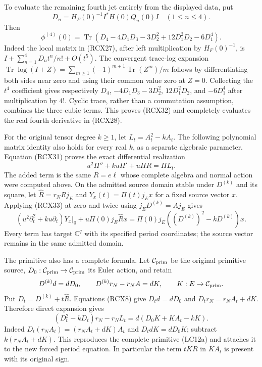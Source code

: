 \documentclass{article}
\begin{document}
To evaluate the remaining fourth jet entirely from the displayed
data, put
\[
 D_n=H_F(0)^{-1}I^*H(0)Q_n(0)I\quad(1\le n\le4).
\]
Then
\[
 \phi^{(4)}(0)=
 \operatorname{Tr}\!\left(
 D_4-4D_1D_3-3D_2^2+12D_1^2D_2-6D_1^4\right).
 \tag{RCX32}
\]
Indeed the local matrix in (RCX27), after left multiplication by
\(H_F(0)^{-1}\), is
\(I+\sum_{n=1}^4D_nt^n/n!+O(t^5)\).
The convergent trace-log expansion
\(\operatorname{Tr}\log(I+Z)
=\sum_{m\ge1}(-1)^{m+1}\operatorname{Tr}(Z^m)/m\)
follows by differentiating both sides near zero and using their
common value zero at \(Z=0\).
Collecting the \(t^4\) coefficient gives respectively
\(D_4\), \(-4D_1D_3-3D_2^2\),
\(12D_1^2D_2\), and \(-6D_1^4\) after multiplication by \(4!\).
Cyclic trace, rather than a commutation assumption, combines the
three cubic terms. This proves (RCX32) and completely evaluates
the real fourth derivative in (RCX28).

For the original tensor degree \(k\ge1\), let \(L_t=A_t^2-kA_t\).
The following polynomial matrix identity also holds for every real
\(k\), as a separate algebraic parameter.
Equation (RCX31) proves the exact differential realization
\[
 \boxed{u^2\Pi''+ku\Pi'+u\Pi R=\Pi L_t.}
 \tag{RCX33}
\]
The added term is the same \(R=e\ell\) whose complete algebra
and normal action were computed above. On the admitted source
domain stable under \(D^{(k)}\) and its square, let
\(\widehat R=r_NRj_E\) and \(Y_x(t)=\Pi(t)j_Ex\) for a fixed
source vector \(x\). Applying (RCX33) at zero and twice using
\(j_ED^{(k)}=Aj_E\) gives
\[
 (u^2\partial_t^2+ku\partial_t)Y_x|_0
       +u\Pi(0)j_E\widehat R x
 =\Pi(0)j_E((D^{(k)})^2-kD^{(k)})x .
 \tag{RCX34}
\]
Every term has target \(\mathbb C^q\) with its specified period
coordinates; the source vector remains in the same admitted domain.

The primitive also has a complete formula. Let
\(\mathcal C_{\rm prim}\) be the original primitive source,
\(D_0:\mathcal C_{\rm prim}\to\mathcal C_{\rm prim}\) its Euler
action, and retain
\[
 D^{(k)}d=dD_0,\qquad
 D^{(k)}r_N-r_NA=dK,\qquad K:E\to\mathcal C_{\rm prim}.
\]
Put \(D_t=D^{(k)}+t\widehat R\). Equations (RCX8) give
\(D_td=dD_0\) and \(D_tr_N=r_NA_t+dK\).
Therefore direct expansion gives
\[
 \boxed{(D_t^2-kD_t)r_N-r_NL_t
       =d(D_0K+KA_t-kK).}
 \tag{RCX35}
\]
Indeed \(D_t(r_NA_t)=(r_NA_t+dK)A_t\) and
\(D_tdK=dD_0K\); subtract \(k(r_NA_t+dK)\).
This reproduces the complete primitive (LC12a) and attaches it
to the new forced period equation. In particular the term
\(tKR\) in \(KA_t\) is present with its original sign.
\end{document}
